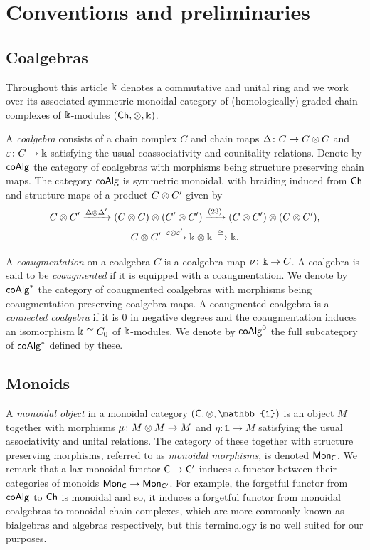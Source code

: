 
\section{Conventions and preliminaries}\label{s:preliminaries}

\subsection{Coalgebras}\label{ss:coalgebras}

Throughout this article $\Bbbk$ denotes a commutative and unital ring and we work over its associated symmetric monoidal category of (homologically) graded chain complexes of $\Bbbk$-modules $(\mathsf{Ch}, \otimes, \Bbbk)$.

A \textit{coalgebra} consists of a chain complex $C$ and chain maps $\Delta \colon C \to C \otimes C$ and $\varepsilon \colon C \to \Bbbk$ satisfying the usual coassociativity and counitality relations.
Denote by $\mathsf{coAlg}$ the category of coalgebras with morphisms being structure preserving chain maps.
The category $\mathsf{coAlg}$ is symmetric monoidal, with braiding induced from $\mathsf{Ch}$ and structure maps of a product $C \otimes C^\prime$ given by
\begin{gather*}
	C \otimes C^\prime \xrightarrow{\Delta \otimes \Delta^\prime}
	(C \otimes C) \otimes (C^\prime \otimes C^\prime) \xrightarrow{(23)}
	(C \otimes C^\prime) \otimes (C \otimes C^\prime), \\
	C \otimes C^\prime \xrightarrow{\varepsilon \otimes \varepsilon^\prime}
	\Bbbk \otimes \Bbbk \xrightarrow{\cong} \Bbbk.
\end{gather*}

A \textit{coaugmentation} on a coalgebra $C$ is a coalgebra map $\nu \colon \Bbbk \to C$.
A coalgebra is said to be \textit{coaugmented} if it is equipped with a coaugmentation.
We denote by $\mathsf{coAlg}^\ast$ the category of coaugmented coalgebras with morphisms being coaugmentation preserving coalgebra maps.
A coaugmented coalgebra is a \textit{connected coalgebra} if it is $0$ in negative degrees and the coaugmentation induces an isomorphism $\Bbbk \cong C_0$ of $\Bbbk$-modules.
We denote by $\mathsf{coAlg}^0$ the full subcategory of $\mathsf{coAlg}^\ast$ defined by these.

\subsection{Monoids}

A \textit{monoidal object} in a monoidal category $(\sC, \ot, \mathbb{1})$ is an object $M$ together with morphisms $\mu \colon M \otimes M \to M$ and $\eta \colon \mathbb{1} \to M$ satisfying the usual associativity and unital relations.
The category of these together with structure preserving morphisms, referred to as \textit{monoidal morphisms}, is denoted $\mathsf{Mon}_{\mathsf{C}}$.
We remark that a lax monoidal functor $\mathsf{C} \to \mathsf{C}^\prime$ induces a functor between their categories of monoids $\mathsf{Mon}_{\mathsf{C}} \to \mathsf{Mon}_{\mathsf{C}^\prime}$.
For example, the forgetful functor from $\mathsf{coAlg}$ to $\mathsf{Ch}$ is monoidal and so, it induces a forgetful functor from monoidal coalgebras to monoidal chain complexes, which are more commonly known as bialgebras and algebras respectively, but this terminology is no well suited for our purposes.

